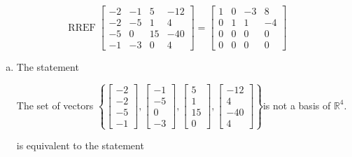 \begin{exerciseAnswer} 


\[\operatorname{RREF} \left[\begin{array}{cccc}
-2 & -1 & 5 & -12 \\
-2 & -5 & 1 & 4 \\
-5 & 0 & 15 & -40 \\
-1 & -3 & 0 & 4
\end{array}\right] = \left[\begin{array}{cccc}
1 & 0 & -3 & 8 \\
0 & 1 & 1 & -4 \\
0 & 0 & 0 & 0 \\
0 & 0 & 0 & 0
\end{array}\right] \]


\begin{enumerate}[(a)]
\item The statement 
\begin{center}\begin{minipage}{0.8\textwidth}
 The set of vectors \( \left\{ \left[\begin{array}{c}
-2 \\
-2 \\
-5 \\
-1
\end{array}\right] , \left[\begin{array}{c}
-1 \\
-5 \\
0 \\
-3
\end{array}\right] , \left[\begin{array}{c}
5 \\
1 \\
15 \\
0
\end{array}\right] , \left[\begin{array}{c}
-12 \\
4 \\
-40 \\
4
\end{array}\right] \right\} \)is not a basis of \(\mathbb{R}^4\). 
\end{minipage}\end{center}
     is equivalent to the statement 
\begin{center}\begin{minipage}{0.8\textwidth}
 The set of vectors \( \left\{ \left[\begin{array}{c}
-2 \\

\end{array}
\end{minipage}
\end{center}
\end{enumerate}
\end{exerciseAnswer}
